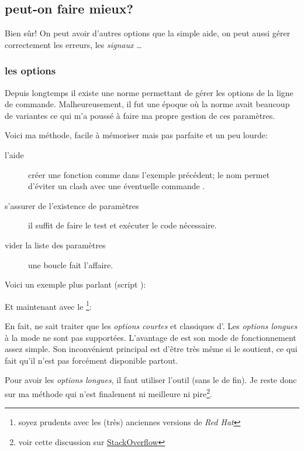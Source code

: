 \subsection{peut-on faire mieux?}
Bien sûr! On peut avoir d'autres options que la simple aide, on peut aussi gérer correctement les erreurs, les \emph{signaux \unix}\ldots

\subsubsection{les options}
Depuis longtemps il existe une norme \POSIX{} permettant de gérer les options de la ligne
de commande. Malheureusement, il fut une époque où la norme avait beaucoup de variantes
ce qui m'a poussé à faire ma propre gestion de ces paramètres.

Voici ma méthode, facile à mémoriser mais pas parfaite et un peu lourde:

\begin{description}
    \item[l'aide] créer une fonction  comme dans l'exemple précédent;
    le nom  permet d'éviter un clash avec une éventuelle commande .
    \item[s'assurer de l'existence de paramètres] il suffit de faire le test \code{[ \$\# -eq 0 ]} et
    exécuter le code nécessaire.
    \item[vider la liste des paramètres] une boucle  fait l'affaire.
\end{description}

Voici un exemple plus parlant (script ):


Et maintenant avec le \footnote{soyez prudents avec les (très) anciennes versions de \emph{Red Hat}}:


En fait,  ne sait traiter que les \emph{options courtes} et classiques d'\unix. Les \emph{options longues}
à la mode \linux{} ne sont pas supportées. L'avantage de  est son mode de fonctionnement
assez simple. Son inconvénient principal est d'être très \bash{} même si \POSIX{} le soutient, ce qui fait qu'il
n'est pas forcément disponible partout.

Pour avoir les \emph{options longues}, il faut utiliser l'outil \GNU{}  (sans le  de fin).
Je reste donc sur ma méthode qui n'est finalement ni meilleure ni pire\footnote{voir cette discussion sur
\href{http://stackoverflow.com/questions/402377/using-getopts-in-bash-shell-script-to-get-long-and-short-command-line-options}{StackOverflow}}.
